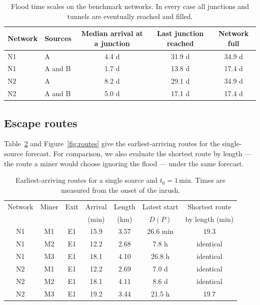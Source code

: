 \documentclass[11pt,a4paper]{article}
\theoremstyle{plain}
\theoremstyle{definition}
\theoremstyle{remark}
\begin{document}
\begin{table}[htbp]
  \centering\small
  \begin{tabular}{@{}l l c c c@{}}
    \toprule
    Network & Sources & Median arrival at a junction & Last junction reached & Network full \\
    \midrule
    N1 & A        & 4.4 d & 31.9 d & 34.9 d \\
    N1 & A and B  & 1.7 d & 13.8 d & 17.4 d \\
    N2 & A        & 8.2 d & 29.1 d & 34.9 d \\
    N2 & A and B  & 5.0 d & 17.1 d & 17.4 d \\
    \bottomrule
  \end{tabular}
  \caption{Flood time scales on the benchmark networks. In every case all junctions and tunnels are eventually reached and filled.}
  \label{tab:flood}
\end{table}

\subsection{Escape routes}
Table~\ref{tab:routes} and Figure~\ref{fig:routes} give the earliest-arriving routes for the single-source forecast. For comparison, we also evaluate the shortest route by length --- the route a miner would choose ignoring the flood --- under the same forecast.

\begin{table}[htbp]
  \centering\small
  \begin{tabular}{@{}c c c c c c c@{}}
    \toprule
    Network & Miner & Exit & Arrival & Length & Latest start & Shortest route \\
            &       &      & (min)   & (km)   & $D(P)$       & by length (min) \\
    \midrule
    N1 & M1 & E1 & 15.9 & 3.57 & 26.6 min & 19.3 \\
    N1 & M2 & E1 & 12.2 & 2.68 & 7.8 h    & identical \\
    N1 & M3 & E1 & 18.1 & 4.10 & 26.8 h   & identical \\
    N2 & M1 & E1 & 12.2 & 2.69 & 7.0 d    & identical \\
    N2 & M2 & E1 & 18.1 & 4.11 & 8.6 d    & identical \\
    N2 & M3 & E1 & 19.2 & 3.44 & 21.5 h   & 19.7 \\
    \bottomrule
  \end{tabular}
  \caption{Earliest-arriving routes for a single source and $t_0 = 1$\,min. Times are measured from the onset of the inrush.}
  \label{tab:routes}
\end{table}
\end{document}
